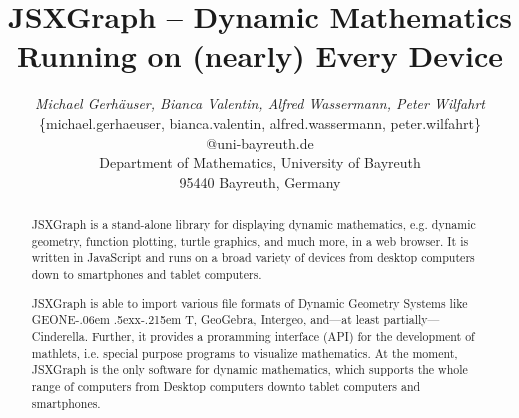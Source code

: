 \documentclass[12pt,a4paper]{article}%
\def\GEONExT{GEONE\kern-.06em \lower.5ex\hbox{x}\kern-.215em T}
\begin{document}
%
%
\title{JSXGraph -- Dynamic Mathematics Running on (nearly) Every Device}%
%
%
\author{\begin{tabular}{c}
\textit{Michael Gerh\"auser, Bianca Valentin, Alfred Wassermann, Peter Wilfahrt} \\
\{michael.gerhaeuser, bianca.valentin, alfred.wassermann, peter.wilfahrt\}\\@uni-bayreuth.de\\
Department of Mathematics, 
University of Bayreuth\\
95440 Bayreuth, 
Germany\end{tabular}
}%
%
\date{}                                                   %
\maketitle                                                %
%
%
\begin{abstract}
%
JSXGraph is a stand-alone library for displaying dynamic mathematics, e.g. dynamic geometry, 
function plotting, turtle graphics, and much more, in a web browser. 
It is written in JavaScript and runs on a broad variety of devices from 
desktop computers down to smartphones and tablet computers. 

JSXGraph is able to import various file formats of Dynamic Geometry Systems like \GEONExT{}, GeoGebra, Intergeo, 
and---at least partially---Cinderella. Further, it provides a proramming
interface (API) for the development of mathlets, i.e. special
purpose programs to visualize mathematics.
At the moment, JSXGraph is the only software for dynamic mathematics, which
supports the whole range of computers from Desktop computers
downto tablet computers and smartphones.
%
\end{abstract}%
%
\thispagestyle{fancy}                                     %
%
%
\end{document}
